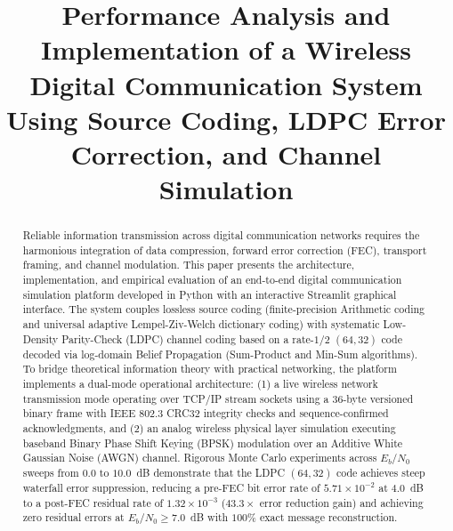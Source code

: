 \documentclass[conference]{IEEEtran}
\begin{document}
\title{Performance Analysis and Implementation of a Wireless Digital Communication System Using Source Coding, LDPC Error Correction, and Channel Simulation}

\author{
  \and
  \and
}

\maketitle

\begin{abstract}
Reliable information transmission across digital communication networks requires the harmonious integration of data compression, forward error correction (FEC), transport framing, and channel modulation. This paper presents the architecture, implementation, and empirical evaluation of an end-to-end digital communication simulation platform developed in Python with an interactive Streamlit graphical interface. The system couples lossless source coding (finite-precision Arithmetic coding and universal adaptive Lempel-Ziv-Welch dictionary coding) with systematic Low-Density Parity-Check (LDPC) channel coding based on a rate-$1/2$ $(64, 32)$ code decoded via log-domain Belief Propagation (Sum-Product and Min-Sum algorithms). To bridge theoretical information theory with practical networking, the platform implements a dual-mode operational architecture: (1) a live wireless network transmission mode operating over TCP/IP stream sockets using a 36-byte versioned binary frame with IEEE 802.3 CRC32 integrity checks and sequence-confirmed acknowledgments, and (2) an analog wireless physical layer simulation executing baseband Binary Phase Shift Keying (BPSK) modulation over an Additive White Gaussian Noise (AWGN) channel. Rigorous Monte Carlo experiments across $E_b/N_0$ sweeps from $0.0$ to $10.0$~dB demonstrate that the LDPC $(64, 32)$ code achieves steep waterfall error suppression, reducing a pre-FEC bit error rate of $5.71 \times 10^{-2}$ at $4.0$~dB to a post-FEC residual rate of $1.32 \times 10^{-3}$ ($43.3\times$ error reduction gain) and achieving zero residual errors at $E_b/N_0 \ge 7.0$~dB with $100\%$ exact message reconstruction.
\end{abstract}
\end{document}
